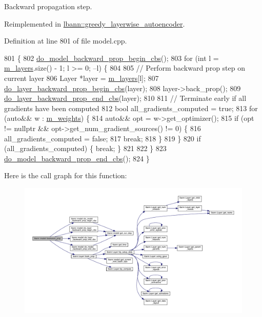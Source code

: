 Backward propagation step. 

Reimplemented in \hyperlink{classlbann_1_1greedy__layerwise__autoencoder_a6d39fda041fe570a668cb72594508062}{lbann\+::greedy\+\_\+layerwise\+\_\+autoencoder}.



Definition at line 801 of file model.\+cpp.


\begin{DoxyCode}
801                           \{
802   \hyperlink{classlbann_1_1model_a8a60eee343381e657b2c042637e56751}{do\_model\_backward\_prop\_begin\_cbs}();
803   \textcolor{keywordflow}{for} (\textcolor{keywordtype}{int} l = \hyperlink{classlbann_1_1model_a0229fc226ec163d1411548446104569d}{m\_layers}.size() - 1; l >= 0; --l) \{
804 
805     \textcolor{comment}{// Perform backward prop step on current layer}
806     Layer *layer = \hyperlink{classlbann_1_1model_a0229fc226ec163d1411548446104569d}{m\_layers}[l];
807     \hyperlink{classlbann_1_1model_a51dc59ea8dd4bc689854732269aaf001}{do\_layer\_backward\_prop\_begin\_cbs}(layer);
808     layer->back\_prop();
809     \hyperlink{classlbann_1_1model_ab0939d2668cca7efc2cc52355d34df3b}{do\_layer\_backward\_prop\_end\_cbs}(layer);
810 
811     \textcolor{comment}{// Terminate early if all gradients have been computed}
812     \textcolor{keywordtype}{bool} all\_gradients\_computed = \textcolor{keyword}{true};
813     \textcolor{keywordflow}{for} (\textcolor{keyword}{auto}&& w : \hyperlink{classlbann_1_1model_aaf9adefe4497d90bf5bc2567e71bfb00}{m\_weights}) \{
814       \textcolor{keyword}{auto}&& opt = w->get\_optimizer();
815       \textcolor{keywordflow}{if} (opt != \textcolor{keyword}{nullptr} && opt->get\_num\_gradient\_sources() != 0) \{
816         all\_gradients\_computed = \textcolor{keyword}{false};
817         \textcolor{keywordflow}{break};
818       \}
819     \}
820     \textcolor{keywordflow}{if} (all\_gradients\_computed) \{ \textcolor{keywordflow}{break}; \}
821 
822   \}
823   \hyperlink{classlbann_1_1model_a737a0129eadf52be476034888b3eedc2}{do\_model\_backward\_prop\_end\_cbs}();
824 \}
\end{DoxyCode}
Here is the call graph for this function\+:\nopagebreak
\begin{figure}[H]
\begin{center}
\leavevmode
\includegraphics[width=350pt]{classlbann_1_1model_a2ce4444efaab4dd1236c837d6847e438_cgraph}
\end{center}
\end{figure}
